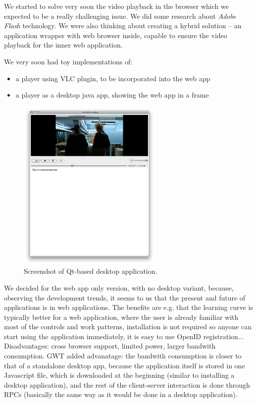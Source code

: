 We started to solve very soon the video playback in the browser which we expected to be a really challenging issue. We did some research about \emph{Adobe Flash} technology. We were also thinking about creating a hybrid solution -- an application wrapper with web browser inside, capable to ensure the video playback for the inner web application.

We very soon had toy implementations of:

\begin{itemize}
\item a player using VLC plugin, to be incorporated into the web app

\item a player as a desktop java app, showing the web app in a frame
\end{itemize}

\begin{figure}[h!]
	\centering
		\includegraphics[width=7cm]{figures/desktop-app-player.png}
	\caption{Screenshot of Qt-based desktop application.}
	\label{fig:figures_desktop-app-player}
\end{figure}

We decided for the web app only version, with no desktop variant, because, observing the development trends, it seems to us that the present and future of applications is in web applications. The benefits are e.g. that the learning curve is typically better for a web application, where the user is already familiar with most of the controls and work patterns, installation is not required so anyone can start using the application immediately, it is easy to use OpenID registration... Disadvantages: cross browser support, limited power, larger bandwith consumption. GWT added advanatage: the bandwith consumption is closer to that of a standalone desktop app, because the application itself is stored in one Javascript file, which is downloaded at the beginning (similar to installing a desktop application), and the rest of the client-server interaction is done through RPCs (basically the same way as it would be done in a desktop application).


